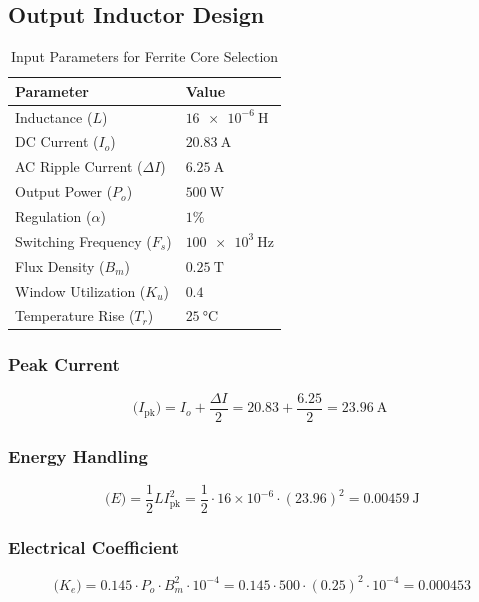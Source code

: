 \subsection{Output Inductor Design}
\begin{table}[h!]
\centering
\caption{Input Parameters for Ferrite Core Selection}
\begin{tabular}{ll}
\toprule
\textbf{Parameter} & \textbf{Value} \\ \midrule
Inductance (\(L\)) & \(\SI{16e-6}{\henry}\) \\
DC Current (\(I_o\)) & \(\SI{20.83}{\ampere}\) \\
AC Ripple Current (\(\Delta I\)) & \(\SI{6.25}{\ampere}\) \\
Output Power (\(P_o\)) & \(\SI{500}{\watt}\) \\
Regulation (\(\alpha\)) & \(1\%\) \\
Switching Frequency (\(F_s\)) & \(\SI{100e3}{\hertz}\) \\
Flux Density (\(B_m\)) & \(\SI{0.25}{\tesla}\) \\
Window Utilization (\(K_u\)) & \(0.4\) \\
Temperature Rise (\(T_r\)) & \(\SI{25}{\celsius}\) \\ \bottomrule
\end{tabular}
\end{table}

\subsubsection*{Peak Current}
\begin{equation}
\text{(\(I_{\text{pk}}\))} = I_o + \frac{\Delta I}{2} = 20.83 + \frac{6.25}{2} = \boxed{\SI{23.96}{\ampere}}
\end{equation}

\subsubsection*{Energy Handling}
\begin{equation}
\text{ (\(E\))} = \frac{1}{2} L I_{\text{pk}}^2 = \frac{1}{2} \cdot 16 \times 10^{-6} \cdot (23.96)^2 = \boxed{\SI{0.00459}{\joule}}
\end{equation}

\subsubsection*{Electrical Coefficient}
\begin{equation}
\text{ (\(K_e\))} = 0.145 \cdot P_o \cdot B_m^2 \cdot 10^{-4} 
= 0.145 \cdot 500 \cdot (0.25)^2 \cdot 10^{-4}
= \boxed{0.000453}
\end{equation}

